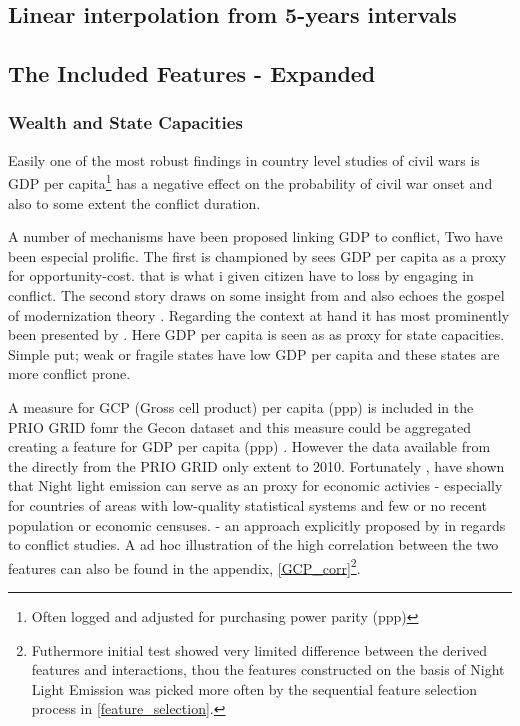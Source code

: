 \documentclass[a4paper]{article}
\begin{document}
\subsection{Linear interpolation from 5-years intervals}\label{interpolation}

\subsection{The Included Features - Expanded}\label{feature_expanded}


\subsubsection{Wealth and State Capacities}

 Easily one of the most robust findings in country level studies of civil wars is GDP per capita\footnote{Often logged and adjusted for purchasing power parity (ppp)} has a negative effect on the probability of civil war onset \citep{Collier_Hoeffler_1998, Fearon_Laitin_2003, Collier_Hoeffler_2004, Hegre_Sambanis_2006, Blattman_Miguel_2010} and also to some extent the conflict duration\citep{Fearon_2004, Hegre_Oestby_Raleigh_2009}.\par
 
 A number of mechanisms have been proposed linking GDP to conflict, Two have been especial prolific. The first is championed by \cite{Collier_Hoeffler_1998, Collier_Hoeffler_2004} sees GDP per capita as a proxy for opportunity-cost. that is what i given citizen have to loss by engaging in conflict. The second story draws on some insight from \cite{Skocpol_1979} and also echoes the gospel of modernization theory \citep{Lipset_1959}. Regarding the context at hand it has most prominently been presented by \cite{Fearon_Laitin_2003}. Here GDP per capita is seen as as proxy for state capacities. Simple put; weak or fragile states have low GDP per capita and these states are more conflict prone\citep[88]{Fearon_Laitin_2003}.\par
 
 A measure for GCP (Gross cell product) per capita (ppp) is included in the PRIO GRID fomr the Gecon dataset \citep{Nordhaus_2006} and this measure could be aggregated creating a feature for GDP per capita (ppp) \citep{prio_code_2015}. However the data available from the directly from the PRIO GRID only extent to 2010. Fortunately \cite{Elvidge_2009}, \cite{Chen_Nordhuas_2011} have shown that Night light emission can serve as an proxy for economic activies - especially for countries of areas with low-quality statistical systems and few or no recent population or economic censuses. \citep{Chen_Nordhuas_2011} - an approach explicitly proposed by \cite[p. 101]{Cederman_Gleditsch_Buhaug_2013} in regards to conflict studies. A ad hoc illustration of the high correlation between the two features can also be found in the appendix, \autoref{GCP_corr}\footnote{Futhermore initial test showed very limited difference between the derived features and interactions, thou the features constructed on the basis of Night Light Emission was picked more often by the sequential feature selection process in \autoref{feature_selection}.}.\par
 
\end{document}
